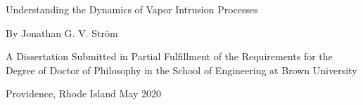 \begin{titlepage}

Understanding the Dynamics of Vapor Intrusion Processes

By
Jonathan G. V. Ström

A Dissertation Submitted in Partial Fulfillment of the Requirements for the Degree
of
Doctor of Philosophy in the School of Engineering at Brown University

Providence, Rhode Island
May 2020

\end{titlepage}
